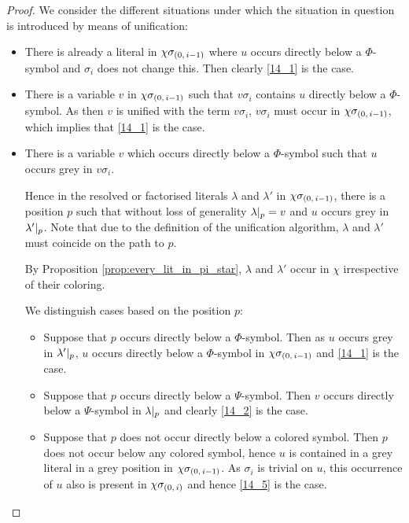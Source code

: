 \documentclass[,%
	draft=false,%
	numbers=noendperiod
	12pt,
	a4paper,
	oneside,%
	openany,
]{memoir}
\newcommand{\inv}{\ensuremath{\chi}}
\begin{document}
\begin{proof}
	We consider the different situations under which the situation in question is introduced by means of unification: 

	\begin{itemize}
		\item
			There is already a literal in $\inv\sigmazmi$ where $u$ occurs directly below a $\Phi$-symbol and $\sigma_i$ does not change this.
			Then clearly \ref{14_1} is the case.

		\item
			There is a variable $v$ in $\inv\sigmazmi$ such that $v\sigma_i$ contains $u$ directly below a $\Phi$-symbol.
			As then $v$ is unified with the term $v\sigma_i$, $v\sigma_i$ must occur in $\inv\sigmazmi$, which implies that \ref{14_1} is the case.

		\item
			There is a variable $v$ which occurs directly below a $\Phi$-symbol such that $u$ occurs grey in $v\sigma_i$.

			Hence in the resolved or factorised literals $\lambda$ and $\lambda'$ in $\inv\sigmazmi$, there is a position $p$ such that without loss of generality $\lambda|_{p} = v$ and $u$ occurs grey in $\lambda'|_{p}$. 
			Note that due to the definition of the unification algorithm, $\lambda$ and $\lambda'$ must coincide on the path to $p$.

			By Proposition \ref{prop:every_lit_in_pi_star}, $\lambda$ and $\lambda'$ occur in $\inv$ irrespective of their coloring.

			We distinguish cases based on the position $p$:

			\begin{itemize}
				\item Suppose that $p$ occurs directly below a $\Phi$-symbol.
					Then as $u$ occurs grey in  $\lambda'|_{p}$, $u$ occurs directly below a $\Phi$-symbol in $\inv\sigmazmi$ and \ref{14_1} is the case.

				\item Suppose that $p$ occurs directly below a $\Psi$-symbol.
					Then $v$ occurs directly below a $\Psi$-symbol in $\lambda|_{p}$ and clearly \ref{14_2} is the case.

				\item
					Suppose that $p$ does not occur directly below a colored symbol.
					Then $p$ does not occur below any colored symbol, hence $u$ is contained in a grey literal in a grey position in $\inv\sigmazmi$. 
					As $\sigma_i$ is trivial on $u$, this occurrence of $u$ also is present in $\inv\sigmazi$ and hence \ref{14_5} is the case.

			\end{itemize}
	\end{itemize}

\end{proof}
\end{document}
